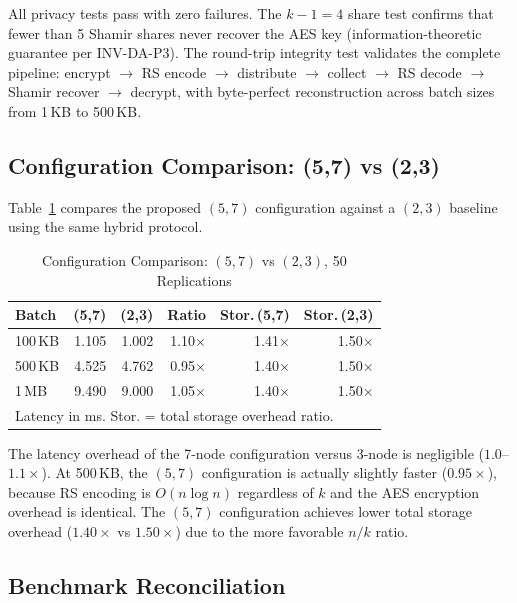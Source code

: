 All privacy tests pass with zero failures. The $k - 1 = 4$ share test
confirms that fewer than 5 Shamir shares never recover the AES key
(information-theoretic guarantee per INV-DA-P3). The round-trip
integrity test validates the complete pipeline: encrypt $\rightarrow$
RS encode $\rightarrow$ distribute $\rightarrow$ collect $\rightarrow$
RS decode $\rightarrow$ Shamir recover $\rightarrow$ decrypt, with
byte-perfect reconstruction across batch sizes from 1\,KB to 500\,KB.

\subsection{Configuration Comparison: (5,7) vs (2,3)}

Table~\ref{tab:comparison} compares the proposed $(5,7)$ configuration
against a $(2,3)$ baseline using the same hybrid protocol.

\begin{table}[t]
\centering
\caption{Configuration Comparison: $(5,7)$ vs $(2,3)$, 50 Replications}
\label{tab:comparison}
\begin{tabular}{@{}lrrrrr@{}}
\toprule
\textbf{Batch} & \textbf{(5,7)} & \textbf{(2,3)} & \textbf{Ratio} & \textbf{Stor.\,(5,7)} & \textbf{Stor.\,(2,3)} \\
\midrule
100\,KB & 1.105 & 1.002 & 1.10$\times$ & 1.41$\times$ & 1.50$\times$ \\
500\,KB & 4.525 & 4.762 & 0.95$\times$ & 1.40$\times$ & 1.50$\times$ \\
1\,MB   & 9.490 & 9.000 & 1.05$\times$ & 1.40$\times$ & 1.50$\times$ \\
\bottomrule
\multicolumn{6}{l}{\footnotesize Latency in ms. Stor. = total storage overhead ratio.} \\
\end{tabular}
\end{table}

The latency overhead of the 7-node configuration versus 3-node is
negligible ($1.0$--$1.1\times$). At 500\,KB, the $(5,7)$ configuration
is actually slightly faster ($0.95\times$), because RS encoding is
$O(n \log n)$ regardless of $k$ and the AES encryption overhead is
identical. The $(5,7)$ configuration achieves lower total storage
overhead ($1.40\times$ vs $1.50\times$) due to the more favorable
$n/k$ ratio.

\subsection{Benchmark Reconciliation}

